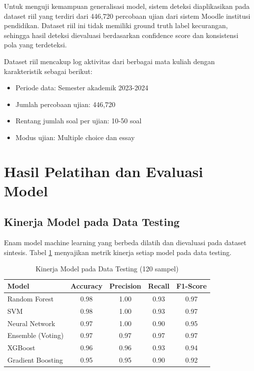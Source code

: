 Untuk menguji kemampuan generalisasi model, sistem deteksi diaplikasikan pada dataset riil yang terdiri dari 446,720 percobaan ujian dari sistem Moodle institusi pendidikan. Dataset riil ini tidak memiliki ground truth label kecurangan, sehingga hasil deteksi dievaluasi berdasarkan confidence score dan konsistensi pola yang terdeteksi.

Dataset riil mencakup log aktivitas dari berbagai mata kuliah dengan karakteristik sebagai berikut:
\begin{itemize}
    \item Periode data: Semester akademik 2023-2024
    \item Jumlah percobaan ujian: 446,720
    \item Rentang jumlah soal per ujian: 10-50 soal
    \item Modus ujian: Multiple choice dan essay
\end{itemize}

\section{Hasil Pelatihan dan Evaluasi Model}
\label{sec:hasilPelatihanEvaluasi}

\subsection{Kinerja Model pada Data Testing}
\label{subsec:kinerjaModelTesting}

Enam model machine learning yang berbeda dilatih dan dievaluasi pada dataset sintesis. Tabel \ref{tabel:kinerjaModel} menyajikan metrik kinerja setiap model pada data testing.

\begin{table}[htbp]
\centering
\caption{Kinerja Model pada Data Testing (120 sampel)}
\label{tabel:kinerjaModel}
\begin{tabular}{|l|c|c|c|c|}
\hline
\textbf{Model} & \textbf{Accuracy} & \textbf{Precision} & \textbf{Recall} & \textbf{F1-Score} \\
\hline
Random Forest & 0.98 & 1.00 & 0.93 & 0.97 \\
\hline
SVM & 0.98 & 1.00 & 0.93 & 0.97 \\
\hline
Neural Network & 0.97 & 1.00 & 0.90 & 0.95 \\
\hline
Ensemble (Voting) & 0.97 & 0.97 & 0.97 & 0.97 \\
\hline
XGBoost & 0.96 & 0.96 & 0.93 & 0.94 \\
\hline
Gradient Boosting & 0.95 & 0.95 & 0.90 & 0.92 \\
\hline
\end{tabular}
\end{table}

